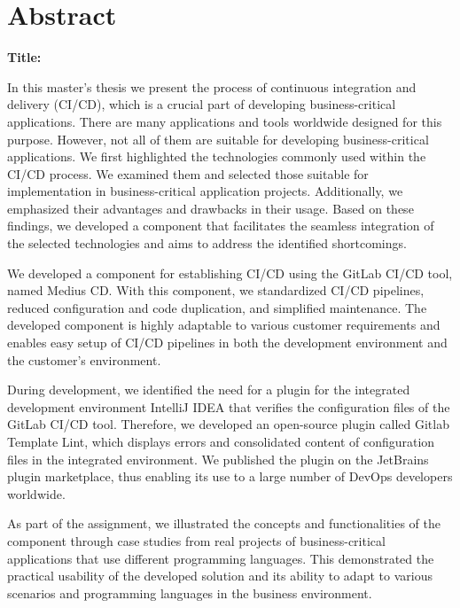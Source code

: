 \chapter*{Abstract}

\noindent\textbf{Title:} \ttitleEn
\bigskip

In this master's thesis we present the process of continuous integration and delivery (CI/CD), which is a crucial part of developing business-critical applications. There are many applications and tools worldwide designed for this purpose. However, not all of them are suitable for developing business-critical applications. We first highlighted the technologies commonly used within the CI/CD process. We examined them and selected those suitable for implementation in business-critical application projects. Additionally, we emphasized their advantages and drawbacks in their usage. Based on these findings, we developed a component that facilitates the seamless integration of the selected technologies and aims to address the identified shortcomings.

We developed a component for establishing CI/CD using the GitLab CI/CD tool, named Medius CD. With this component, we standardized CI/CD pipelines, reduced configuration and code duplication, and simplified maintenance. The developed component is highly adaptable to various customer requirements and enables easy setup of CI/CD pipelines in both the development environment and the customer's environment.

During development, we identified the need for a plugin for the integrated development environment IntelliJ IDEA that verifies the configuration files of the GitLab CI/CD tool. Therefore, we developed an open-source plugin called Gitlab Template Lint, which displays errors and consolidated content of configuration files in the integrated environment. We published the plugin on the JetBrains plugin marketplace, thus enabling its use to a large number of DevOps developers worldwide.

As part of the assignment, we illustrated the concepts and functionalities of the component through case studies from real projects of business-critical applications that use different programming languages. This demonstrated the practical usability of the developed solution and its ability to adapt to various scenarios and programming languages in the business environment.

